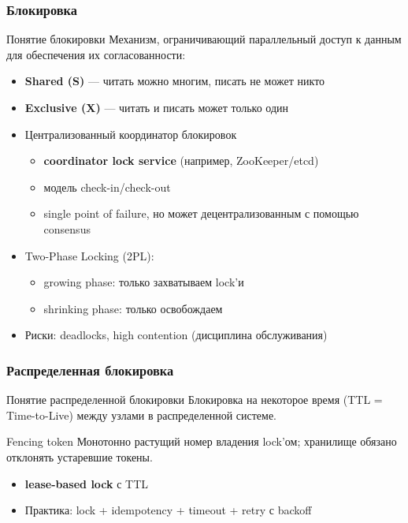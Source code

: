 \documentclass{beamer}
\begin{document}
\begin{frame}
\frametitle{Блокировка}

\begin{block}{Понятие блокировки}
Механизм, ограничивающий параллельный доступ к данным для обеспечения их согласованности:
\begin{itemize}
\item \textbf{Shared (S)} --- читать можно многим, писать не может никто
\item \textbf{Exclusive (X)} --- читать и писать может только один
\end{itemize}
\end{block}

\begin{itemize}

  \item Централизованный координатор блокировок
  \begin{itemize}
    \item \textbf{coordinator lock service} (например, ZooKeeper/etcd)
    \item модель check-in/check-out
    \item single point of failure, но может децентрализованным с помощью consensus
  \end{itemize}

  \item Two-Phase Locking (2PL):
  \begin{itemize}
    \item growing phase: только захватываем lock'и
    \item shrinking phase: только освобождаем
  \end{itemize}
  
  \item Риски: deadlocks, high contention (дисциплина обслуживания)
\end{itemize}

\end{frame}

\begin{frame}
\frametitle{Распределенная блокировка}

\begin{block}{Понятие распределенной блокировки}
Блокировка на некоторое время (TTL = Time-to-Live) между узлами в распределенной системе.
\end{block}

\begin{block}{Fencing token}
Монотонно растущий номер владения lock'ом; хранилище обязано отклонять устаревшие токены.
\end{block}

\begin{itemize}
  \item \textbf{lease-based lock} с TTL
  \item Практика: lock + idempotency + timeout + retry с backoff
\end{itemize}

\end{frame}
\end{document}
